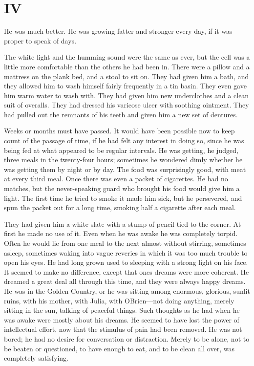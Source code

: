 \section{IV}\label{iv-2}

He was much better. He was growing fatter and stronger every day, if it
was proper to speak of days.

The white light and the humming sound were the same as ever, but the
cell was a little more comfortable than the others he had been in. There
were a pillow and a mattress on the plank bed, and a stool to sit on.
They had given him a bath, and they allowed him to wash himself fairly
frequently in a tin basin. They even gave him warm water to wash with.
They had given him new underclothes and a clean suit of overalls. They
had dressed his varicose ulcer with soothing ointment. They had pulled
out the remnants of his teeth and given him a new set of dentures.

Weeks or months must have passed. It would have been possible now to
keep count of the passage of time, if he had felt any interest in doing
so, since he was being fed at what appeared to be regular intervals. He
was getting, he judged, three meals in the twenty-four hours; sometimes
he wondered dimly whether he was getting them by night or by day. The
food was surprisingly good, with meat at every third meal. Once there
was even a packet of cigarettes. He had no matches, but the
never-speaking guard who brought his food would give him a light. The
first time he tried to smoke it made him sick, but he persevered, and
spun the packet out for a long time, smoking half a cigarette after each
meal.

They had given him a white slate with a stump of pencil tied to the
corner. At first he made no use of it. Even when he was awake he was
completely torpid. Often he would lie from one meal to the next almost
without stirring, sometimes asleep, sometimes waking into vague reveries
in which it was too much trouble to open his eyes. He had long grown
used to sleeping with a strong light on his face. It seemed to make no
difference, except that one\textquotesingle s dreams were more coherent.
He dreamed a great deal all through this time, and they were always
happy dreams. He was in the Golden Country, or he was sitting among
enormous, glorious, sunlit ruins, with his mother, with Julia, with
O\textquotesingle Brien---not doing anything, merely sitting in the sun,
talking of peaceful things. Such thoughts as he had when he was awake
were mostly about his dreams. He seemed to have lost the power of
intellectual effort, now that the stimulus of pain had been removed. He
was not bored; he had no desire for conversation or distraction. Merely
to be alone, not to be beaten or questioned, to have enough to eat, and
to be clean all over, was completely satisfying.

